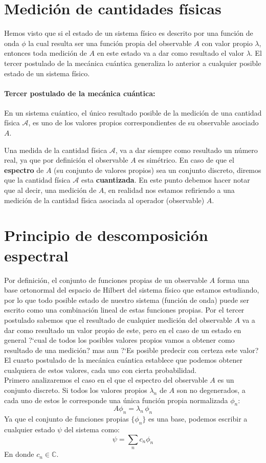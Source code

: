 \documentclass[12pt]{book}
\numberwithin{equation}{chapter}
\def\C{\mathbb{C}}
\begin{document}
\section{Medici\'on de cantidades f\'isicas}
Hemos visto que si el estado de un sistema f\'isico es descrito por una funci\'on de onda $\phi$ la cual resulta ser una funci\'on propia del observable $A$ con valor propio $\lambda$, entonces toda medici\'on de $A$ en este estado va a dar como resultado el valor $\lambda$. El tercer postulado de la mec\'anica cu\'antica generaliza lo anterior a cualquier posible estado de un sistema f\'isico.

\paragraph{Tercer postulado de la mec\'anica cu\'antica:} En un sistema cu\'antico, el \'unico resultado posible de la medici\'on de una cantidad f\'isica $\mathcal{A}$, es uno de los valores propios correspondientes de su observable asociado $A$.

\rightline{$\dag$}
\vspace{3 mm}

Una medida de la cantidad f\'isica $\mathcal{A}$, va a dar siempre como resultado un n\'umero real, ya que por definici\'on el observable $A$ es sim\'etrico. En caso de que el {\bf espectro} de $A$ (su conjunto de valores propios) sea un conjunto discreto, diremos que la cantidad f\'isica $\mathcal{A}$ esta {\bf cuantizada}. En este punto debemos hacer notar que al decir, una medici\'on de $A$, en realidad nos estamos refiriendo a una medici\'on de la cantidad f\'isica asociada al operador (observable) $A$.

\section{Principio de descomposici\'on espectral}
Por definici\'on, el conjunto de funciones propias de un observable $A$ forma una base ortonormal del espacio de Hilbert del sistema f\'isico que estamos estudiando, por lo que todo posible estado de nuestro sistema (funci\'on de onda) puede ser escrito como una combinaci\'on lineal de estas funciones propias. Por el tercer postulado sabemos que el resultado de cualquier medici\'on del observable $A$ va a dar como resultado un valor propio de este, pero en el caso de un estado en general ?`cual de todos los posibles valores propios vamos a obtener como resultado de una medici\'on? mas aun ?`Es posible predecir con certeza este valor? El cuarto postulado de la mec\'anica cu\'antica establece que podemos obtener cualquiera de estos valores, cada uno con cierta probabilidad.\\ 
Primero analizaremos el caso en el que el espectro del observable $A$ es un conjunto discreto. Si todos los valores propios $\lambda_{n}$ de $A$ son no degenerados, a cada uno de estos le corresponde una \'unica funci\'on propia normalizada $\phi_{n}$:
$$ A \phi_{n}= \lambda_{n}\, \phi_{n} $$
Ya que el conjunto de funciones propias $\{ \phi_{n} \}$ es una base, podemos escribir a cualquier estado $\psi$ del sistema como:
$$ \psi = \sum_{n} c_{n} \phi_{n} $$
En donde $c_{n} \in \C$.
\end{document}
